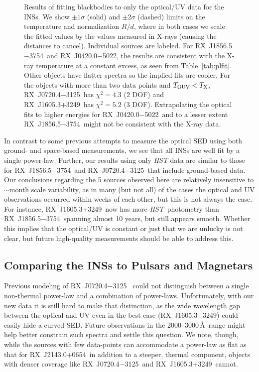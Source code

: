 \documentclass[iop]{emulateapj}
\newcommand{\rxjw}{RX~J1856.5$-$3754}
\newcommand{\rxjk}{RX~J0720.4$-$3125}
\newcommand{\rbsb}{RX~J2143.0+0654}
\newcommand{\rxjvk}{RX~J1605.3+3249}
\newcommand{\rxjb}{RX~J0420.0$-$5022}
\newcommand{\hst}{{\em HST}}
\begin{document}
\begin{figure}
\caption{Results of fitting blackbodies to only the optical/UV data
  for the INSs.  We show $\pm1\sigma$ (solid) and $\pm2\sigma$
  (dashed) limits on the temperature and normalization $R/d$, where in
  both cases we scale the fitted values by the values measured in
  X-rays (causing the distances to cancel).  Individual sources are
  labeled.  For \rxjw\ and \rxjb, the results are consistent with the
  X-ray temperature at a constant excess, as seen from
  Table~\ref{tab:plfit}.  Other objects have flatter spectra so the
  implied fits are cooler.  For the objects with more than two data
  points and $T_{\rm OUV}<T_{\rm X}$, \rxjk\ has $\chi^2=4.3$ (2 DOF)
  and \rxjvk\ has $\chi^2=5.2$ (3 DOF).  Extrapolating the optical
  fits to higher energies for \rxjb\ and to a lesser extent
  \rxjw\ might not be consistent with the X-ray data.}
\label{fig:bbfit}
\end{figure}

In contrast to some previous attempts to measure the optical SED using
both ground- and space-based measurements, we see that all INSs are
well fit by a single power-law.  Further, our results using only
\textit{HST} data are similar to those for \rxjw\ and \rxjk\ that
include ground-based data.  Our conclusions regarding the 5 sources
observed here are relatively insensitive to $\sim$month scale
variability, as in many (but not all) of the cases the optical and UV
observations occurred within weeks of each other, but this is not
always the case.  For instance, \rxjvk\ now has more \hst\ photometry
than \rxjw\ spanning almost 10 years, but still appears smooth.
Whether this implies that the optical/UV is constant or just that we
are unlucky is not clear, but future high-quality measurements should
be able to address this.

\subsection{Comparing the INSs to Pulsars and Magnetars}
Previous modeling of \rxjk\ \citep{kvkm+03} could not distinguish
between a single non-thermal power-law and a combination of
power-laws.  Unfortunately, with our new data it is still hard to make
that distinction, as the wide wavelength gap between the optical and
UV even in the best case (\rxjvk) could easily hide a curved SED.  
Future observations in the 2000--3000\,\AA\ range might help better
constrain such spectra and settle this question.  We note, though,
while the sources with few data-points can accommodate a power-law as
flat as that for \rbsb\ in addition to a steeper, thermal component,
objects with denser coverage like \rxjk\ and \rxjvk\ cannot.  
\end{document}
